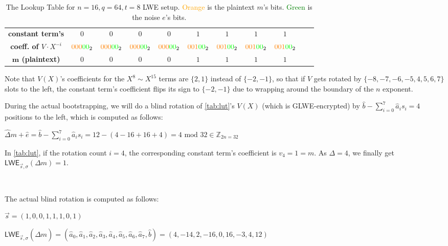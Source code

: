 \begin{enumerate}
\begin{table}[h]
\begin{tabular}{|c||c|c|c|c|c|c|c|c|c|c|}
\hline
\textbf{constant term's} & $0$ & $0$ & $0$ & $0$ & $1$ & $1$ & $1$ & $1$ \\
\textbf{coeff. of $V\cdot X^{-i}$}& $\textcolor{orange}{000}\textcolor{green}{00}_2$ & $\textcolor{orange}{000}\textcolor{green}{00}_2$ & $\textcolor{orange}{000}\textcolor{green}{00}_2$ & $\textcolor{orange}{000}\textcolor{green}{00}_2$ & $\textcolor{orange}{001}\textcolor{green}{00}_2$ & $\textcolor{orange}{001}\textcolor{green}{00}_2$ & $\textcolor{orange}{001}\textcolor{green}{00}_2$ & $\textcolor{orange}{001}\textcolor{green}{00}_2$ \\
\hline
\textbf{$\bm{m}$ (plaintext)} & $0$ & $0$ & $0$ & $0$ & $1$ & $1$ & $1$ & $1$ \\
\hline
\end{tabular}
\centering
\caption{The Lookup Table for $n=16, q=64, t=8$ LWE setup.
\textcolor{orange}{Orange} is the plaintext $m$'s bits. \textcolor{green}{Green} is the noise $e$'s bits. %
}
\label{tab:lut}
\end{table}

Note that $V(X)$'s coefficients for the $X^8 \sim X^{15}$ terms are $\{2, 1\}$ instead of $\{-2, -1\}$, so that if $V$ gets rotated by $\{-8,-7,-6,-5,4,5,6,7\}$ slots to the left, the constant term's coefficient flips its sign to $\{-2, -1\}$ due to wrapping around the boundary of the $n$ exponent. 

During the actual bootstrapping, we will do a blind rotation of \autoref{tab:lut}'s $V(X)$ (which is GLWE-encrypted) by $\hat{b} - \sum\limits_{i=0}^{7}\hat{a}_is_i = 4$ positions to the left, which is computed as follows:

$\hat\Delta m + \hat e = \hat{b} - \sum\limits_{i=0}^{7}\hat{a}_is_i = 12 - (4 - 16 + 16 + 4) = 4 \text{ mod 32} \in \mathbb{Z}_{2n=32}$ 


In \autoref{tab:lut}, if the rotation count $i = 4$, the corresponding constant term's coefficient is $v_4 = 1 = m$. As $\Delta = 4$, we finally get $\textsf{LWE}_{\vec{s},\sigma}(\Delta m) = 1$. 



$ $

The actual blind rotation is computed as follows:

$\vec{s} = (1, 0, 0, 1, 1, 1, 0, 1)$

$\textsf{LWE}_{\vec{s}, \sigma}(\hat{\Delta}m) = (\hat{a}_0, \hat{a}_1, \hat{a}_2, \hat{a}_3, \hat{a}_4, \hat{a}_5, \hat{a}_6, \hat{a}_7, \hat{b}) =  (4, -14, 2, -16, 0, 16, -3, 4, 12)$


\end{enumerate}
